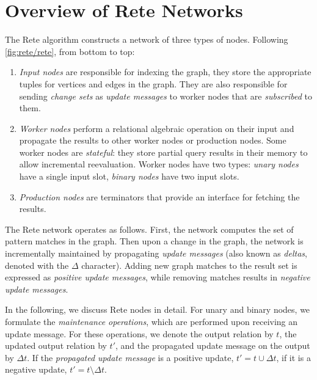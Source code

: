 \section{Overview of Rete Networks}
\label{sec:rete}


The Rete algorithm constructs a network of three types of nodes. Following \autoref{fig:rete/rete}, from bottom to top:

\begin{enumerate}
	\item \emph{Input nodes} are responsible for indexing the graph, \ie they store the appropriate tuples for vertices and edges in the graph. They are also responsible for sending \emph{change sets} as \emph{update messages} to worker nodes that are \emph{subscribed} to them.
	\item \emph{Worker nodes} perform a relational algebraic operation on their input and propagate the results to other worker nodes or production nodes. Some worker nodes are \emph{stateful}: they store partial query results in their memory to allow incremental reevaluation.
	Worker nodes have two types: \emph{unary nodes} have a single input slot, \emph{binary nodes} have two input slots.
	\item \emph{Production nodes} are terminators that provide an interface for fetching the results.
\end{enumerate}

The Rete network operates as follows. First, the network computes the set of pattern matches in the graph. Then upon a change in the graph, the network is incrementally maintained by propagating \emph{update messages} (also known as \emph{deltas}, denoted with the $\Delta$ character). Adding new graph matches to the result set is expressed as \emph{positive update messages}, while removing matches results in \emph{negative update messages}.


In the following, we discuss Rete nodes in detail. For unary and binary nodes, we formulate the \emph{maintenance operations}, which are performed upon receiving an update message. For these operations, we denote the output relation by $t$, the updated output relation by $t'$, and the propagated update message on the output by $\Delta t$. If the \emph{propagated update message} is a positive update, $t' = t \cup \Delta t$, if it is a negative update, $t' = t \setminus \Delta t$.

